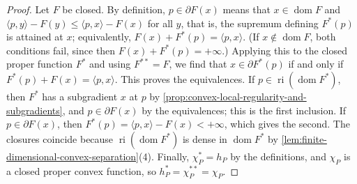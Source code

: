 \begin{proof}
Let $F$ be closed. By definition, $p\in\partial F(x)$ means that $x\in\operatorname{dom}F$ and $\langle p,y\rangle-F(y)\leq\langle p,x\rangle-F(x)$ for all $y$, that is, the supremum defining $F^*(p)$ is attained at $x$; equivalently, $F(x)+F^*(p)=\langle p,x\rangle$. (If $x\notin\operatorname{dom}F$, both conditions fail, since then $F(x)+F^*(p)=+\infty$.) Applying this to the closed proper function $F^*$ and using $F^{**}=F$, we find that $x\in\partial F^*(p)$ if and only if $F^*(p)+F(x)=\langle p,x\rangle$. This proves the equivalences. If $p\in\operatorname{ri}(\operatorname{dom}F^*)$, then $F^*$ has a subgradient $x$ at $p$ by \cref{prop:convex-local-regularity-and-subgradients}, and $p\in\partial F(x)$ by the equivalences; this is the first inclusion. If $p\in\partial F(x)$, then $F^*(p)=\langle p,x\rangle-F(x)<+\infty$, which gives the second. The closures coincide because $\operatorname{ri}(\operatorname{dom}F^*)$ is dense in $\operatorname{dom}F^*$ by \cref{lem:finite-dimensional-convex-separation}(4). Finally, $\chi_P^*=h_P$ by the definitions, and $\chi_P$ is a closed proper convex function, so $h_P^*=\chi_P^{**}=\chi_P$.
\end{proof}

